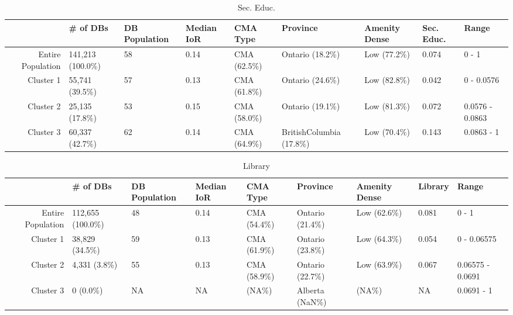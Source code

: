 \documentclass[10pt, a4paper]{article}
\begin{document}
\begin{sidewaystable}[ht]
\centering
\begin{tabular}{rllllllll}
  \hline
 & \# of DBs & DB Population & Median IoR & CMA Type & Province & Amenity Dense & Sec. Educ. & Range \\ 
  \hline
Entire Population & 141,213 (100.0\%) & 58 & 0.14 & CMA (62.5\%) & Ontario (18.2\%) & Low (77.2\%) & 0.074 & 0 - 1 \\ 
  Cluster 1 & 55,741 (39.5\%) & 57 & 0.13 & CMA (61.8\%) & Ontario (24.6\%) & Low (82.8\%) & 0.042 & 0 - 0.0576 \\ 
  Cluster 2 & 25,135 (17.8\%) & 53 & 0.15 & CMA (58.0\%) & Ontario (19.1\%) & Low (81.3\%) & 0.072 & 0.0576 - 0.0863 \\ 
  Cluster 3 & 60,337 (42.7\%) & 62 & 0.14 & CMA (64.9\%) & BritishColumbia (17.8\%) & Low (70.4\%) & 0.143 & 0.0863 - 1 \\ 
   \hline
\end{tabular}
\caption{Sec. Educ.} 
\end{sidewaystable}





 \pagebreak 
 
\begin{sidewaystable}[ht]
\centering
\begin{tabular}{rllllllll}
  \hline
 & \# of DBs & DB Population & Median IoR & CMA Type & Province & Amenity Dense & Library & Range \\ 
  \hline
Entire Population & 112,655 (100.0\%) & 48 & 0.14 & CMA (54.4\%) & Ontario (21.4\%) & Low (62.6\%) & 0.081 & 0 - 1 \\ 
  Cluster 1 & 38,829 (34.5\%) & 59 & 0.13 & CMA (61.9\%) & Ontario (23.8\%) & Low (64.3\%) & 0.054 & 0 - 0.06575 \\ 
  Cluster 2 & 4,331 (3.8\%) & 55 & 0.13 & CMA (58.9\%) & Ontario (22.7\%) & Low (63.9\%) & 0.067 & 0.06575 - 0.0691 \\ 
  Cluster 3 & 0 (0.0\%) & NA & NA &  (NA\%) & Alberta (NaN\%) &  (NA\%) & NA & 0.0691 - 1 \\ 
   \hline
\end{tabular}
\caption{Library} 
\end{sidewaystable}
\end{document}
